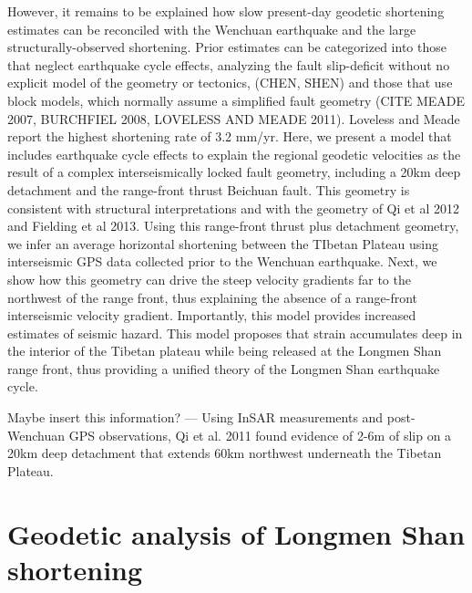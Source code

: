 \documentclass{article}
\begin{document}
However, it remains to be explained how slow present-day geodetic shortening estimates can be reconciled with the Wenchuan earthquake and the large structurally-observed shortening. Prior estimates can be categorized into those that neglect earthquake cycle effects, analyzing the fault slip-deficit without no explicit model of the geometry or tectonics, (CHEN, SHEN) and those that use block models, which normally assume a simplified fault geometry (CITE MEADE 2007, BURCHFIEL 2008, LOVELESS AND MEADE 2011). Loveless and Meade report the highest shortening rate of 3.2 mm/yr.  Here, we present a model that includes earthquake cycle effects to explain the regional geodetic velocities as the result of a complex interseismically locked fault geometry, including a 20km deep detachment and the range-front thrust Beichuan fault.  This geometry is consistent with structural interpretations and with the geometry of Qi et al 2012 and Fielding et al 2013.  Using this range-front thrust plus detachment geometry, we infer an average horizontal shortening between the TIbetan Plateau using interseismic GPS data collected prior to the Wenchuan earthquake.  Next, we show how this geometry can drive the steep velocity gradients far to the northwest of the range front, thus explaining the absence of a range-front interseismic velocity gradient. Importantly, this model provides increased estimates of seismic hazard. This model proposes that strain accumulates deep in the interior of the Tibetan plateau while being released at the Longmen Shan range front, thus providing a unified theory of the Longmen Shan earthquake cycle. 

Maybe insert this information? --- Using InSAR measurements and post-Wenchuan GPS observations, Qi et al. 2011 found evidence of 2-6m of slip on a 20km deep detachment that extends 60km northwest underneath the Tibetan Plateau. 

\section{Geodetic analysis of Longmen Shan shortening}
\end{document}
